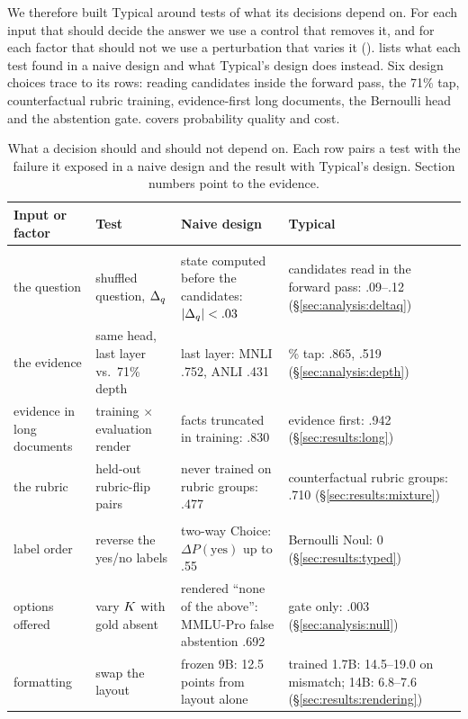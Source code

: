 We therefore built Typical around tests of what its decisions depend on. For each input that should
decide the answer we use a control that removes it, and for each factor that should not we use a
perturbation that varies it ().  lists what each test found in a
naive design and what Typical's design does instead. Six design choices trace to its rows: reading candidates inside the forward pass, the 71\% tap,
counterfactual rubric training, evidence-first long documents, the Bernoulli head and the abstention
gate.  covers probability quality and cost.

\begin{table}[t]
  \centering
  \caption{What a decision should and should not depend on. Each row pairs a test with the failure it
  exposed in a naive design and the result with Typical's design. Section numbers point to the evidence.}
  \label{tab:dependence}
  \small
  \setlength{\tabcolsep}{4pt}
  \renewcommand{\arraystretch}{1.15}
  \begin{tabular}{@{}>{\raggedright\arraybackslash}p{2.1cm}>{\raggedright\arraybackslash}p{2.9cm}>{\raggedright\arraybackslash}p{3.7cm}>{\raggedright\arraybackslash}p{3.6cm}@{}}
    \toprule
    Input or factor & Test & Naive design & Typical \\
    \midrule
    \multicolumn{4}{@{}l}{\emph{The decision should depend on}} \\
    the question & shuffled question, $\Delta_q$ & state computed before the candidates: $|\Delta_q| < .03$ & candidates read in the forward pass: .09--.12 (\S\ref{sec:analysis:deltaq}) \\
    the evidence & same head, last layer vs.\ 71\% depth & last layer: MNLI .752, ANLI .431 & 71\% tap: .865, .519 (\S\ref{sec:analysis:depth}) \\
    evidence in long documents & training $\times$ evaluation render & facts truncated in training: .830 & evidence first: .942 (\S\ref{sec:results:long}) \\
    the rubric & held-out rubric-flip pairs & never trained on rubric groups: .477 & counterfactual rubric groups: .710 (\S\ref{sec:results:mixture}) \\
    \midrule
    \multicolumn{4}{@{}l}{\emph{The decision should not depend on}} \\
    label order & reverse the yes/no labels & two-way Choice: $\Delta P(\text{yes})$ up to .55 & Bernoulli Noul: 0 (\S\ref{sec:results:typed}) \\
    options offered & vary $K$ with gold absent & rendered ``none of the above'': MMLU-Pro false abstention .692 & gate only: .003 (\S\ref{sec:analysis:null}) \\
    formatting & swap the layout & frozen 9B: 12.5 points from layout alone & trained 1.7B: 14.5--19.0 on mismatch; 14B: 6.8--7.6 (\S\ref{sec:results:rendering}) \\
    \bottomrule
  \end{tabular}
\end{table}

